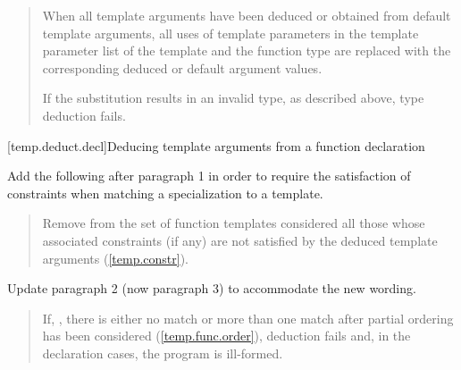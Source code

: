 \begin{quote}
\setcounter{Paras}{4}
\pnum
When all template arguments have been deduced or obtained from default 
template arguments, all uses of template parameters in the template 
parameter list of the template and the function type are replaced with
the corresponding deduced or default argument values. 

If the substitution results in an invalid type, as described above, type 
deduction fails.

\end{quote}

\setcounter{subsection}{5}
[temp.deduct.decl]{Deducing template arguments from a function declaration}

Add the following after paragraph 1 in order to require the
satisfaction of constraints when matching a specialization to a
template.

\begin{quote}
\begin{addedblock}
\setcounter{Paras}{2}
\pnum
Remove from the set of function templates considered all those
whose associated constraints (if any) are not satisfied by the deduced
template arguments (\ref{temp.constr}).
\end{addedblock}
\end{quote}

Update paragraph 2 (now paragraph 3) to accommodate the new wording.

\begin{quote}
\pnum
If, 
,
there is either no match or more than one match after partial ordering 
has been considered (\ref{temp.func.order}), deduction fails 
and, in the declaration cases, the program is ill-formed.
\end{quote}

